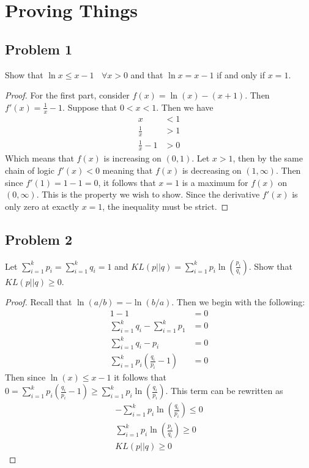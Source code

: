 \documentclass{article}
\theoremstyle{definition}
\begin{document}
\section{Proving Things}
    \subsection*{Problem 1}
        \begin{mdframed}[]
            Show that $\ln x \leqslant x - 1 \ \ \ \ \forall x > 0$ and that $\ln x = x - 1$ if and only if $x = 1$.
        \end{mdframed}
        \begin{proof}
            For the first part, consider $f(x) = \ln(x) - (x + 1)$. Then $f'(x) = \frac{1}{x} - 1$. Suppose that $0 < x < 1$.
            Then we have 
            \begin{align*}
                x &< 1 \\
                \frac{1}{x} &> 1\\
                \frac{1}{x} - 1 & > 0
            \end{align*}
            Which means that $f(x)$ is increasing on $(0,1)$. Let $x > 1$, then by the same chain of logic $f'(x) < 0$ meaning that $f(x)$
            is decreasing on $(1, \infty)$. Then since $f'(1) = 1 - 1 = 0$, it follows that $x = 1$ is a maximum for $f(x)$ on $(0,\infty)$.
            This is the property we wish to show. Since the derivative $f'(x)$ is only zero at exactly $x = 1$, the inequality must be strict.
        \end{proof}
    \subsection*{Problem 2}
        \begin{mdframed}[]
            Let $\sum_{i=1}^kp_i = \sum_{i=1}^kq_i = 1$ and $KL(p || q) = \sum_{i=1}^kp_i \ln\left(\frac{p_i}{q_i}\right)$. Show that $KL(p||q) \geqslant 0$.
        \end{mdframed}
        \begin{proof}
            Recall that $\ln(a/b) = -\ln(b/a)$. Then we begin with the following:
            \begin{align*}
                1 - 1 &= 0 \\
                \sum_{i=1}^kq_i - \sum_{i=1}^kp_1 &= 0\\
                \sum_{i=1}^kq_i-p_i &= 0 \\
                \sum_{i=1}^kp_i\left(\frac{q_i}{p_i} - 1\right) &= 0
            \end{align*}
            Then since $\ln(x) \leqslant x - 1$ it follows that $0 = \sum_{i=1}^kp_i\left(\frac{q_i}{p_i}-1\right) \geqslant \sum_{i=1}^kp_i\ln\left(\frac{q_i}{p_i}\right)$.
            This term can be rewritten as 
            \begin{align*}
                -\sum_{i=1}^kp_i\ln\left(\frac{q_i}{p_i}\right) \leqslant 0 \\
                \sum_{i=1}^kp_i\ln\left(\frac{p_i}{q_i}\right) \geqslant 0 \\
                KL(p||q) \geqslant 0
            \end{align*}
        \end{proof}
\end{document}
